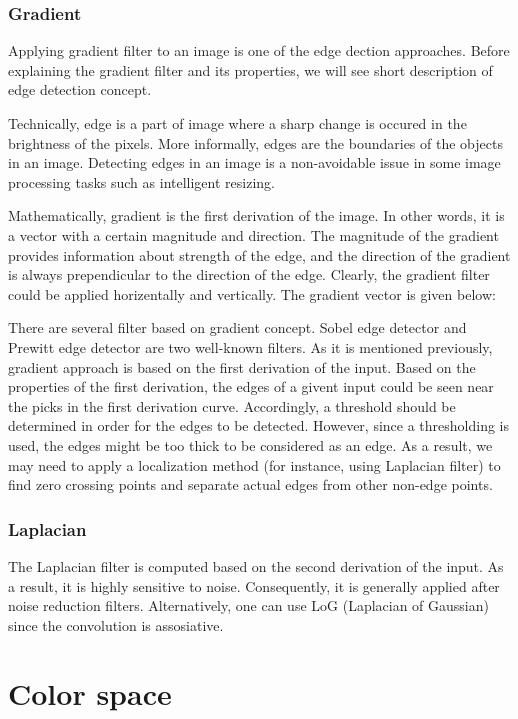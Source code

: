\documentclass{article}
\begin{document}
		\subsubsection{Gradient}

			Applying gradient filter to an image is one of the edge dection approaches. Before explaining the gradient filter and its properties, we will see
			short description of edge detection concept. 
			
			Technically, edge is a part of image where a sharp change is occured in the brightness of the pixels.
			More informally, edges are the boundaries of
			the objects in an image. Detecting edges in an image is a non-avoidable issue in some image processing tasks such as intelligent resizing.
			
			Mathematically, gradient is the first derivation of the image. In other words, it is a vector with a certain magnitude and direction. 
			The magnitude of the gradient provides information about strength
			of the edge, and the direction of the gradient is always prependicular to the direction of the edge. Clearly, the gradient filter could be
			applied horizentally and vertically. The gradient vector is given below:

			There are several filter based on gradient concept. Sobel edge detector and Prewitt edge detector are two well-known filters.
			As it is mentioned previously, gradient approach is based on the first derivation of the input. Based on the properties of
			the first derivation, the edges of a givent input could be seen near the picks in the first derivation curve. Accordingly, a threshold should be
			determined in order for the edges to be detected. However, since a thresholding is used, the edges might be too thick to be considered
			as an edge. As a result, we may need to apply a localization method (for instance, using Laplacian filter) to find zero
			crossing points and separate actual edges from other non-edge points.
		
		\subsubsection{Laplacian}
			The Laplacian filter is computed based on the second derivation of the input. As a result, it is highly sensitive to noise. Consequently,
			it is generally applied after noise reduction filters. Alternatively, one can use LoG (Laplacian of Gaussian) since the convolution is
			assosiative.
			

\section{Color space}          
\end{document}
